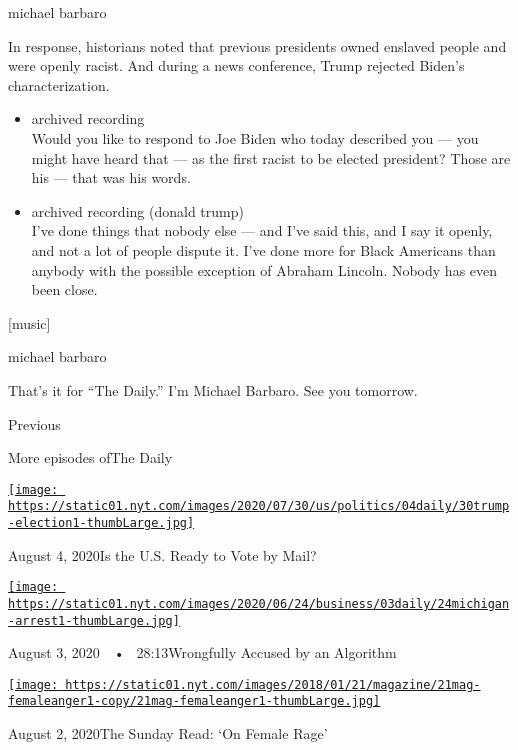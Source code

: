 michael barbaro

In response, historians noted that previous presidents owned enslaved
people and were openly racist. And during a news conference, Trump
rejected Biden's characterization.

\begin{itemize}
\item
  archived recording\\
  Would you like to respond to Joe Biden who today described you --- you
  might have heard that --- as the first racist to be elected president?
  Those are his --- that was his words.
\item
  archived recording (donald trump)\\
  I've done things that nobody else --- and I've said this, and I say it
  openly, and not a lot of people dispute it. I've done more for Black
  Americans than anybody with the possible exception of Abraham Lincoln.
  Nobody has even been close.
\end{itemize}

{[}music{]}

michael barbaro

That's it for ``The Daily.'' I'm Michael Barbaro. See you tomorrow.

Previous

More episodes ofThe Daily

\href{https://www.nytimes.com/2020/08/04/podcasts/the-daily/mail-in-voting-president-trump.html?action=click\&module=audio-series-bar\&region=header\&pgtype=Article}{\texttt{[image: https://static01.nyt.com/images/2020/07/30/us/politics/04daily/30trump-election1-thumbLarge.jpg]}}

August 4, 2020Is the U.S. Ready to Vote by Mail?

\href{https://www.nytimes.com/2020/08/03/podcasts/the-daily/algorithmic-justice-racism.html?action=click\&module=audio-series-bar\&region=header\&pgtype=Article}{\texttt{[image: https://static01.nyt.com/images/2020/06/24/business/03daily/24michigan-arrest1-thumbLarge.jpg]}}

August 3, 2020~~•~ 28:13Wrongfully Accused by an Algorithm

\href{https://www.nytimes.com/2020/08/02/podcasts/the-daily/on-female-rage.html?action=click\&module=audio-series-bar\&region=header\&pgtype=Article}{\texttt{[image: https://static01.nyt.com/images/2018/01/21/magazine/21mag-femaleanger1-copy/21mag-femaleanger1-thumbLarge.jpg]}}

August 2, 2020The Sunday Read: `On Female Rage'

